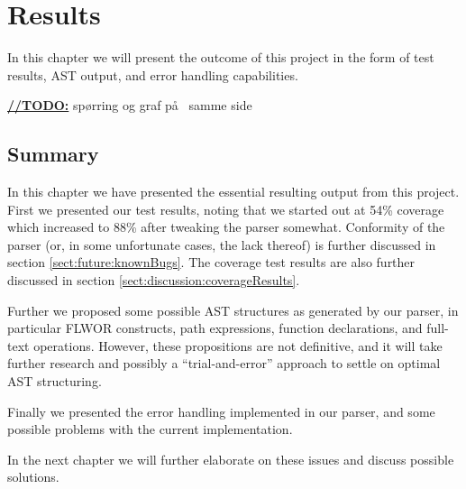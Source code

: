 \chapter{Results}
In this chapter we will present the outcome of this project in the form of test
results, AST output, and error handling capabilities.

\underline{\textbf{\LARGE //TODO:}} sp\o rring og graf p\aa~ samme side





\section{Summary}
In this chapter we have presented the essential resulting output from this
project. First we presented our test results, noting that we started out at   
54\% coverage which increased to 88\% after tweaking the parser somewhat.
Conformity of the parser (or, in some unfortunate cases, the lack thereof) is
further  discussed in section \ref{sect:future:knownBugs}. The coverage test
results are also further discussed in section
\ref{sect:discussion:coverageResults}.

Further we proposed some possible AST structures as generated by our parser, in
particular FLWOR constructs, path expressions, function declarations, and
full-text operations. However, these propositions are not definitive, and it
will take further research and possibly a ``trial-and-error'' approach to settle
on optimal AST structuring.

Finally we presented the error handling implemented in our parser, and some
possible problems with the current implementation. 

In the next chapter we will further elaborate on these issues and discuss
possible solutions.